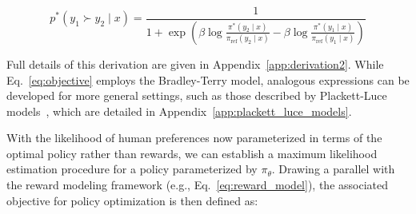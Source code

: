 \begin{equation}\label{eq:objective}
    p^*(y_1\succ y_2 \mid x)=\frac{1}{1 + \exp\left(\beta \log \frac{\pi^*(y_2\mid x)}{\pi_\text{ref}(y_2\mid x)} - \beta \log \frac{\pi^*(y_1\mid x)}{\pi_\text{ref}(y_1\mid x)}\right)}
\end{equation}

Full details of this derivation are given in Appendix~\ref{app:derivation2}. While Eq.~\ref{eq:objective} employs the Bradley-Terry model, analogous expressions can be developed for more general settings, such as those described by Plackett-Luce models~\citep{plackett1975analysis, luce2012individual}, which are detailed in Appendix~\ref{app:plackett_luce_models}.

With the likelihood of human preferences now parameterized in terms of the optimal policy rather than rewards, we can establish a maximum likelihood estimation procedure for a policy parameterized by $\pi_\theta$. Drawing a parallel with the reward modeling framework (e.g., Eq.~\ref{eq:reward_model}), the associated objective for policy optimization is then defined as:

